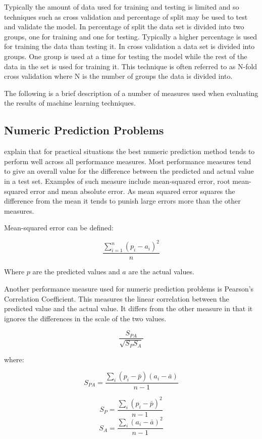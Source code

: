 Typically the amount of data used for training and testing is limited and so techniques such as cross validation and percentage of split may be used to test and validate the model. In percentage of split the data set is divided into two groups, one for training and one for testing. Typically a higher percentage is used for training the data than testing it. In cross validation a data set is divided into groups. One group is used at a time for testing the model while the rest of the data in the set is used for training it. This technique is often referred to as N-fold cross validation where N is the number of groups the data is divided into. 

The following is a brief description of a number of measures used when evaluating the results of machine learning techniques.

\subsection{Numeric Prediction Problems}

\cite{witten2005data} explain that for practical situations the best numeric prediction method tends to perform well across all performance measures. Most performance measures tend to give an overall value for the difference between the predicted and actual value in a test set. Examples of such measure include mean-squared error, root mean-squared error and mean absolute error. As mean squared error squares the difference from the mean it tends to punish large errors more than the other measures.

Mean-squared error can be defined:

$$\frac{\sum \limits_{i=1}^n (p_{i} - a_{i})^2}{n}$$

Where $p$ are the predicted values and $a$ are the actual values.

Another performance measure used for numeric prediction problems is Pearson's Correlation Coefficient. This measures the linear correlation between the predicted value and the actual value. It differs from the other measure in that it ignores the differences in the scale of the two values.

$$\frac{S_{PA}}{\sqrt{S_{P}S_{A}}}$$

where:

$$S_{PA} = \frac{\sum _{i}(p_i - \bar{p})(a_i - \bar{a})}{n - 1}$$

$$S_{P} = \frac{\sum _{i}(p_i - \bar{p})^2}{n - 1}$$
$$S_{A} = \frac{\sum _{i}(a_i - \bar{a})^2}{n - 1}$$


